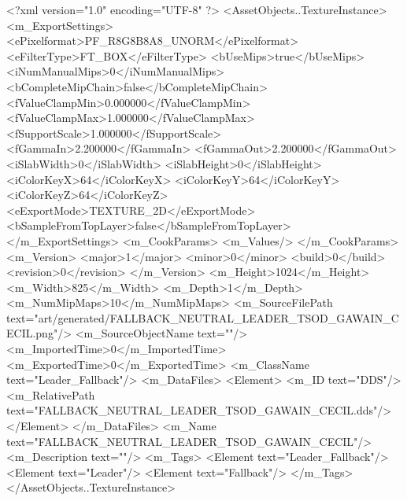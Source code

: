 <?xml version="1.0" encoding="UTF-8" ?>
<AssetObjects..TextureInstance>
	<m_ExportSettings>
		<ePixelformat>PF_R8G8B8A8_UNORM</ePixelformat>
		<eFilterType>FT_BOX</eFilterType>
		<bUseMips>true</bUseMips>
		<iNumManualMips>0</iNumManualMips>
		<bCompleteMipChain>false</bCompleteMipChain>
		<fValueClampMin>0.000000</fValueClampMin>
		<fValueClampMax>1.000000</fValueClampMax>
		<fSupportScale>1.000000</fSupportScale>
		<fGammaIn>2.200000</fGammaIn>
		<fGammaOut>2.200000</fGammaOut>
		<iSlabWidth>0</iSlabWidth>
		<iSlabHeight>0</iSlabHeight>
		<iColorKeyX>64</iColorKeyX>
		<iColorKeyY>64</iColorKeyY>
		<iColorKeyZ>64</iColorKeyZ>
		<eExportMode>TEXTURE_2D</eExportMode>
		<bSampleFromTopLayer>false</bSampleFromTopLayer>
	</m_ExportSettings>
	<m_CookParams>
		<m_Values/>
	</m_CookParams>
	<m_Version>
		<major>1</major>
		<minor>0</minor>
		<build>0</build>
		<revision>0</revision>
	</m_Version>
	<m_Height>1024</m_Height>
	<m_Width>825</m_Width>
	<m_Depth>1</m_Depth>
	<m_NumMipMaps>10</m_NumMipMaps>
	<m_SourceFilePath text="art/generated/FALLBACK_NEUTRAL_LEADER_TSOD_GAWAIN_CECIL.png"/>
	<m_SourceObjectName text=""/>
	<m_ImportedTime>0</m_ImportedTime>
	<m_ExportedTime>0</m_ExportedTime>
	<m_ClassName text="Leader_Fallback"/>
	<m_DataFiles>
		<Element>
			<m_ID text="DDS"/>
			<m_RelativePath text="FALLBACK_NEUTRAL_LEADER_TSOD_GAWAIN_CECIL.dds"/>
		</Element>
	</m_DataFiles>
	<m_Name text="FALLBACK_NEUTRAL_LEADER_TSOD_GAWAIN_CECIL"/>
	<m_Description text=""/>
	<m_Tags>
		<Element text="Leader_Fallback"/>
		<Element text="Leader"/>
		<Element text="Fallback"/>
	</m_Tags>
</AssetObjects..TextureInstance>
